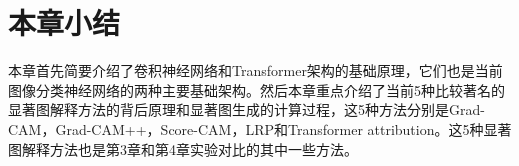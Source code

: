 \section{本章小结}
本章首先简要介绍了卷积神经网络和Transformer架构的基础原理，它们也是当前图像分类神经网络的两种主要基础架构。然后本章重点介绍了当前5种比较著名的显著图解释方法的背后原理和显著图生成的计算过程，这5种方法分别是Grad-CAM，Grad-CAM++，Score-CAM，LRP和Transformer attribution。这5种显著图解释方法也是第3章和第4章实验对比的其中一些方法。




